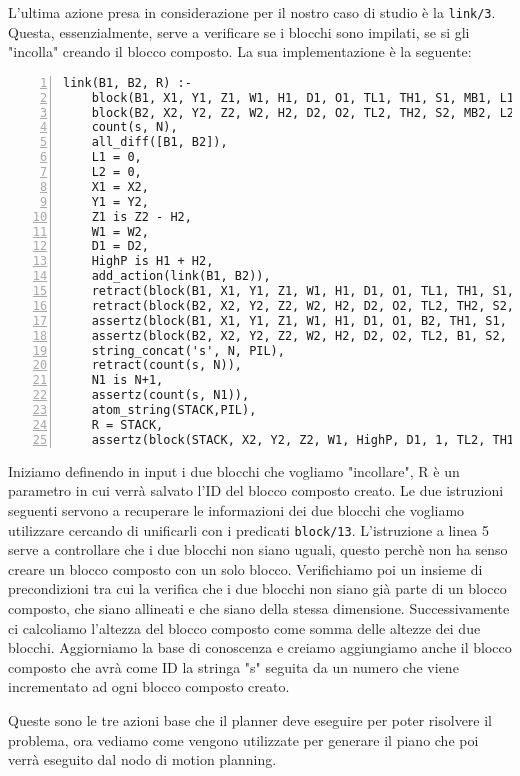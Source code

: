 L'ultima azione presa in considerazione per il nostro caso di studio è la \verb+link/3+. Questa, essenzialmente, serve a verificare se i blocchi sono impilati, se si gli "incolla" creando il blocco composto. La sua implementazione è la seguente:
\begin{Verbatim}[numbers=left]
link(B1, B2, R) :-
    block(B1, X1, Y1, Z1, W1, H1, D1, O1, TL1, TH1, S1, MB1, L1),
    block(B2, X2, Y2, Z2, W2, H2, D2, O2, TL2, TH2, S2, MB2, L2),
    count(s, N),
    all_diff([B1, B2]),
    L1 = 0,
    L2 = 0,
    X1 = X2,
    Y1 = Y2,
    Z1 is Z2 - H2,
    W1 = W2,
    D1 = D2,
    HighP is H1 + H2,
    add_action(link(B1, B2)),
    retract(block(B1, X1, Y1, Z1, W1, H1, D1, O1, TL1, TH1, S1, MB1, L1)),
    retract(block(B2, X2, Y2, Z2, W2, H2, D2, O2, TL2, TH2, S2, MB2, L2)),
    assertz(block(B1, X1, Y1, Z1, W1, H1, D1, O1, B2, TH1, S1, MB1, 1)),
    assertz(block(B2, X2, Y2, Z2, W2, H2, D2, O2, TL2, B1, S2, MB2, 1)),
    string_concat('s', N, PIL),
    retract(count(s, N)),
    N1 is N+1,
    assertz(count(s, N1)),
    atom_string(STACK,PIL),
    R = STACK,
    assertz(block(STACK, X2, Y2, Z2, W1, HighP, D1, 1, TL2, TH1, block, [B1,B2],0)).
\end{Verbatim}
Iniziamo definendo in input i due blocchi che vogliamo "incollare", R è un parametro in cui verrà salvato l'ID del blocco composto creato.
Le due istruzioni seguenti servono a recuperare le informazioni dei due blocchi che vogliamo utilizzare cercando di unificarli con i predicati \verb+block/13+.
L'istruzione a linea 5 serve a controllare che i due blocchi non siano uguali, questo perchè non ha senso creare un blocco composto con un solo blocco. Verifichiamo poi un insieme di precondizioni tra cui la verifica che i due blocchi non siano già parte di un blocco composto, che siano allineati e che siano della stessa dimensione.
Successivamente ci calcoliamo l'altezza del blocco composto come somma delle altezze dei due blocchi. Aggiorniamo la base di conoscenza e creiamo aggiungiamo anche il blocco composto che avrà come ID la stringa "s" seguita da un numero che viene incrementato ad ogni blocco composto creato.

Queste sono le tre azioni base che il planner deve eseguire per poter risolvere il problema, ora vediamo come vengono utilizzate per generare il piano che poi verrà eseguito dal nodo di motion planning.
